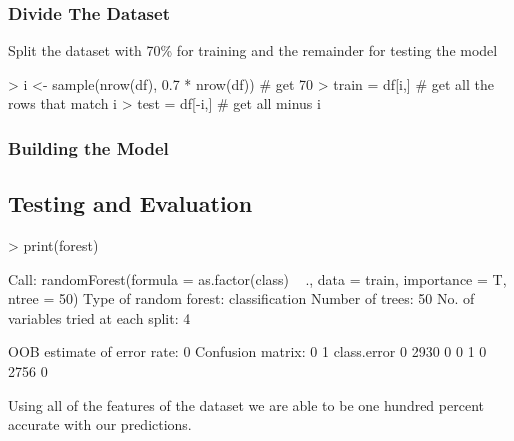 \documentclass[10pt]{article}         %
\begin{document}
\subsubsection{Divide The Dataset}
Split the dataset with 70\% for training and the remainder for testing the model
\begin{Schunk}
\begin{Sinput}
> i <- sample(nrow(df), 0.7 * nrow(df)) # get 70% of the elements
> train = df[i,] # get all the rows that match i
> test =  df[-i,] # get all minus i
\end{Sinput}
\end{Schunk}
\subsubsection{Building the Model}
\begin{Schunk}
\end{Schunk}
\subsection{Testing and Evaluation}
\begin{Schunk}
\begin{Sinput}
> print(forest)
\end{Sinput}
\begin{Soutput}
Call:
 randomForest(formula = as.factor(class) ~ ., data = train, importance = T,      ntree = 50) 
               Type of random forest: classification
                     Number of trees: 50
No. of variables tried at each split: 4

        OOB estimate of  error rate: 0%
Confusion matrix:
     0    1 class.error
0 2930    0           0
1    0 2756           0
\end{Soutput}
\end{Schunk}
Using all of the features of the dataset we are able to be one hundred percent accurate with our predictions.
\end{document}
